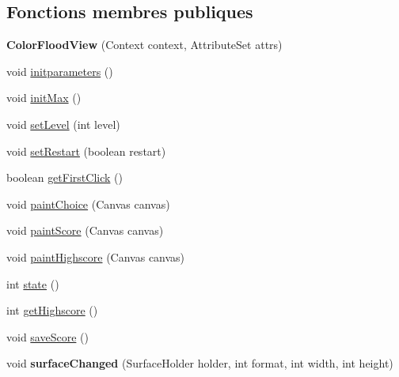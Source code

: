 \subsection*{Fonctions membres publiques}
\begin{DoxyCompactItemize}
\item 
\hypertarget{classp8_1_1demo_1_1colorflood_1_1_color_flood_view_a28d78e47c2619a9d2791ea379ef059b2}{}{\bfseries Color\+Flood\+View} (Context context, Attribute\+Set attrs)\label{classp8_1_1demo_1_1colorflood_1_1_color_flood_view_a28d78e47c2619a9d2791ea379ef059b2}

\item 
void \hyperlink{classp8_1_1demo_1_1colorflood_1_1_color_flood_view_ac9757650005dc20325dd80e17b58c55a}{initparameters} ()
\item 
void \hyperlink{classp8_1_1demo_1_1colorflood_1_1_color_flood_view_a208f67a9f808f3dc8f683eb566810884}{init\+Max} ()
\item 
void \hyperlink{classp8_1_1demo_1_1colorflood_1_1_color_flood_view_af904e361cda2271b0ebf7c10963d0edc}{set\+Level} (int level)
\item 
void \hyperlink{classp8_1_1demo_1_1colorflood_1_1_color_flood_view_a3886613e29f4a823d6d8bcc0f2393b85}{set\+Restart} (boolean restart)
\item 
boolean \hyperlink{classp8_1_1demo_1_1colorflood_1_1_color_flood_view_a1fe95dbfaf8bfe98e49b2d8b688085c1}{get\+First\+Click} ()
\item 
void \hyperlink{classp8_1_1demo_1_1colorflood_1_1_color_flood_view_a0965d8ffa4f137a28f4bf22bd4ac6a2a}{paint\+Choice} (Canvas canvas)
\item 
void \hyperlink{classp8_1_1demo_1_1colorflood_1_1_color_flood_view_aa989675b60f6fcbbe3a4c9a7be4b1561}{paint\+Score} (Canvas canvas)
\item 
void \hyperlink{classp8_1_1demo_1_1colorflood_1_1_color_flood_view_ac3a53a838779e02bc3629e4a49676fd2}{paint\+Highscore} (Canvas canvas)
\item 
int \hyperlink{classp8_1_1demo_1_1colorflood_1_1_color_flood_view_a5666b3002546f071f8e503c009608259}{state} ()
\item 
int \hyperlink{classp8_1_1demo_1_1colorflood_1_1_color_flood_view_a9ca13be0b3ba4f0555ebf44a31634353}{get\+Highscore} ()
\item 
void \hyperlink{classp8_1_1demo_1_1colorflood_1_1_color_flood_view_a8b5270516723415941e281fd45f66093}{save\+Score} ()
\item 
\hypertarget{classp8_1_1demo_1_1colorflood_1_1_color_flood_view_ad14c5593f1ffa3b9693d2498ad9b9ae7}{}void {\bfseries surface\+Changed} (Surface\+Holder holder, int format, int width, int height)\label{classp8_1_1demo_1_1colorflood_1_1_color_flood_view_ad14c5593f1ffa3b9693d2498ad9b9ae7}


\end{DoxyCompactItemize}
